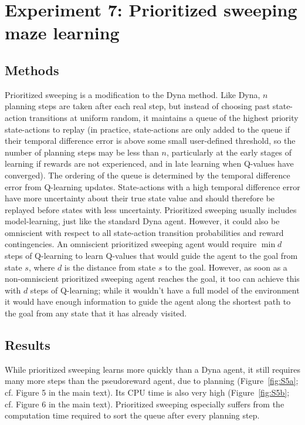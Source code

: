 \documentclass[letterpaper]{article}
\begin{document}
\pagebreak

\section{Experiment 7: Prioritized sweeping maze learning}

\subsection{Methods}

Prioritized sweeping is a modification to the Dyna method. Like Dyna, $n$ planning steps are taken after each real step, but instead of choosing past state-action transitions at uniform random, it maintains a queue of the highest priority state-actions to replay (in practice, state-actions are only added to the queue if their temporal difference error is above some small user-defined threshold, so the number of planning steps may be less than $n$, particularly at the early stages of learning if rewards are not experienced, and in late learning when Q-values have converged). The ordering of the queue is determined by the temporal difference error from Q-learning updates. State-actions with a high temporal difference error have more uncertainty about their true state value and should therefore be replayed before states with less uncertainty. Prioritized sweeping usually includes model-learning, just like the standard Dyna agent. However, it could also be omniscient with respect to all state-action transition probabilities and reward contingencies. An omniscient prioritized sweeping agent would require $\min{d}$ steps of Q-learning to learn Q-values that would guide the agent to the goal from state $s$, where $d$ is the distance from state $s$ to the goal. However, as soon as a non-omniscient prioritized sweeping agent reaches the goal, it too can achieve this with $d$ steps of Q-learning; while it wouldn't have a full model of the environment it would have enough information to guide the agent along the shortest path to the goal from any state that it has already visited.

\subsection{Results}

While prioritized sweeping learns more quickly than a Dyna agent, it still requires many more steps than the pseudoreward agent, due to planning (Figure~\ref{fig:S5a}; cf. Figure 5 in the main text). Its CPU time is also very high (Figure~\ref{fig:S5b}; cf. Figure 6 in the main text). Prioritized sweeping especially suffers from the computation time required to sort the queue after every planning step.
\end{document}
